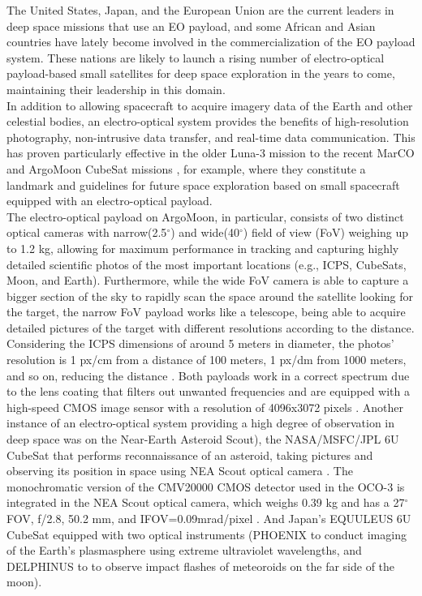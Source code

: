 \documentclass[final,5p,times,twocolumn,authoryear]{elsarticle}
\begin{document}
The United States, Japan, and the European Union are the current leaders in deep space missions that use an EO payload, and some African and Asian countries have lately become involved in the commercialization of the EO payload system. These nations are likely to launch a rising number of electro-optical payload-based small satellites for deep space exploration in the years to come, maintaining their leadership in this domain.\\
In addition to allowing spacecraft to acquire imagery data of the Earth and other celestial bodies, an electro-optical system provides the benefits of high-resolution photography, non-intrusive data transfer, and real-time data communication. This has proven particularly effective in the older Luna-3 mission \citep{siddiqi2018beyond} to the recent MarCO \citep{schoolcraft2017marco} and ArgoMoon CubeSat missions \citep{di2019argomoon}, for example, where they constitute a landmark and guidelines for future space exploration based on small spacecraft equipped with an electro-optical payload. \\The electro-optical payload on ArgoMoon, in particular, consists of two distinct optical cameras \citep{di2019argomoon} with narrow(2.5$^\circ$) and wide(40$^\circ$) field of view (FoV) weighing up to 1.2 kg, allowing for maximum performance in tracking and capturing highly detailed scientific photos of the most important locations (e.g., ICPS, CubeSats, Moon, and Earth). Furthermore, while the wide FoV camera is able to capture a bigger section of the sky to rapidly scan the space around the satellite looking for the target, the narrow FoV payload works like a telescope, being able to acquire detailed pictures of the target with different resolutions according to the distance\citep{simonetti2020argomoon}. Considering the ICPS dimensions of around 5 meters in diameter, the photos’ resolution is 1 px/cm from a distance of 100 meters, 1 px/dm from 1000 meters, and so on, reducing the distance \citep{simonetti2020argomoon}. Both payloads work in a correct spectrum due to the lens coating that filters out unwanted frequencies and are equipped with a high-speed CMOS image sensor with a resolution of 4096x3072 pixels \citep{simonetti2020argomoon}. Another instance of an electro-optical system providing a high degree of observation in deep space was on the Near-Earth Asteroid Scout), the NASA/MSFC/JPL 6U CubeSat that performs reconnaissance of an asteroid, taking pictures and observing its position in space using NEA Scout optical camera \citep{mission2022nea}. The monochromatic version of the CMV20000 CMOS detector used in the OCO-3 is integrated in the NEA Scout optical camera, which weighs 0.39 kg and has a 27$^\circ$ FOV, f/2.8, 50.2 mm, and IFOV=0.09mrad/pixel \citep{mission2022nea}. And Japan's EQUULEUS 6U CubeSat equipped with two optical instruments \citep{funase2020mission} (PHOENIX to conduct imaging of the Earth's plasmasphere using extreme ultraviolet wavelengths, and DELPHINUS to to observe impact flashes of meteoroids on the far side of the moon).\\
\end{document}
